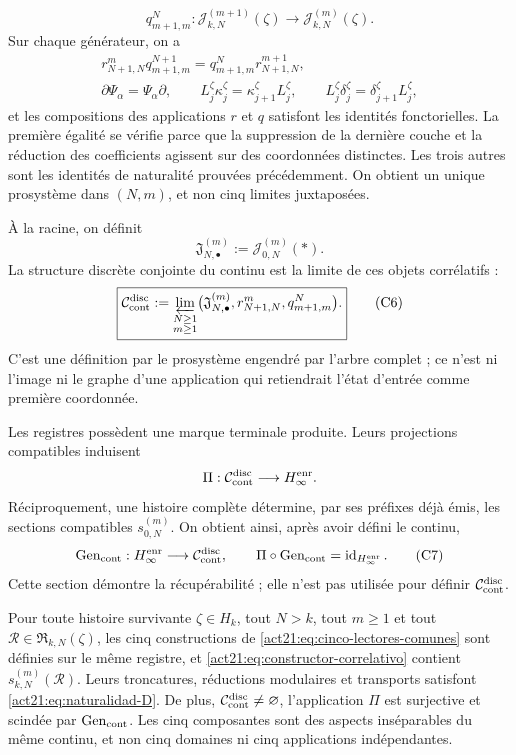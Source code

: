 \[
 q^N_{m+1,m}:\mathcal J_{k,N}^{(m+1)}(\zeta)
 \longrightarrow\mathcal J_{k,N}^{(m)}(\zeta).
\]
Sur chaque générateur, on a
\[
\begin{gathered}
 r^m_{N+1,N}q^{N+1}_{m+1,m}
 =q^N_{m+1,m}r^{m+1}_{N+1,N},\\
 \partial\Psi_\alpha=\Psi_\alpha\partial,
 \qquad L_j^\zeta\kappa_j^\zeta
       =\kappa_{j+1}^\zeta L_j^\zeta,
 \qquad L_j^\zeta\delta_j^\zeta
       =\delta_{j+1}^\zeta L_j^\zeta,
\end{gathered}
\tag{C4}
\label{act21:eq:naturalidad-D}
\]
et les compositions des applications \(r\) et \(q\) satisfont les identités
fonctorielles. La première égalité se vérifie parce que la suppression de la dernière couche et
la réduction des coefficients agissent sur des coordonnées distinctes. Les trois autres
sont les identités de naturalité prouvées précédemment. On obtient un unique
prosystème dans \((N,m)\), et non cinq limites juxtaposées.

À la racine, on définit
\[
 \mathfrak J_{N,\bullet}^{(m)}:=\mathcal J_{0,N}^{(m)}(\ast).
\tag{C5}
\label{act21:eq:fibras-conjuntas-horizonte}
\]
La structure discrète conjointe du continu est la limite de ces objets corrélatifs :
\[
 \boxed{
 \mathcal C_{\rm cont}^{\rm disc}
 :=\varprojlim_{\substack{N\geq1\\m\geq1}}
   \bigl(\mathfrak J_{N,\bullet}^{(m)},
         r^m_{N+1,N},q^N_{m+1,m}\bigr).}
\tag{C6}
\label{act21:eq:continuo-discreto}
\]
C'est une définition par le prosystème engendré par l'arbre complet ; ce n'est
ni l'image ni le graphe d'une application qui retiendrait l'état d'entrée comme
première coordonnée.

Les registres possèdent une marque terminale produite. Leurs projections compatibles induisent
\[
 \Pi:\mathcal C_{\rm cont}^{\rm disc}\longrightarrow H_\infty^{\rm enr}.
\]
Réciproquement, une histoire complète détermine, par ses préfixes déjà émis, les sections compatibles \(s_{0,N}^{(m)}\). On obtient ainsi, après avoir défini le continu,
\[
 \operatorname{Gen}_{\rm cont}:H_\infty^{\rm enr}
 \longrightarrow\mathcal C_{\rm cont}^{\rm disc},
 \qquad
 \Pi\circ\operatorname{Gen}_{\rm cont}
 =\operatorname{id}_{H_\infty^{\rm enr}}.
\tag{C7}
\label{act21:eq:seccion-historias-continuo}
\]
Cette section démontre la récupérabilité ; elle n'est pas utilisée pour définir
\(\mathcal C_{\rm cont}^{\rm disc}\).

\begin{theorem}
\label{act21:thm:correlacion-cinco}
Pour toute histoire survivante \(\zeta\in H_k\), tout \(N>k\), tout
\(m\geq1\) et tout \(\mathscr R\in\mathfrak R_{k,N}(\zeta)\), les cinq
constructions de \eqref{act21:eq:cinco-lectores-comunes} sont définies sur le
même registre, et \eqref{act21:eq:constructor-correlativo} contient
\(s_{k,N}^{(m)}(\mathscr R)\). Leurs troncatures, réductions modulaires et
transports satisfont \eqref{act21:eq:naturalidad-D}. De plus,
\(\mathcal C_{\rm cont}^{\rm disc}\neq\varnothing\), l'application \(\Pi\)
est surjective et scindée par \(\operatorname{Gen}_{\rm cont}\). Les
cinq composantes sont des aspects inséparables du même continu, et non cinq
domaines ni cinq applications indépendantes.
\end{theorem}

